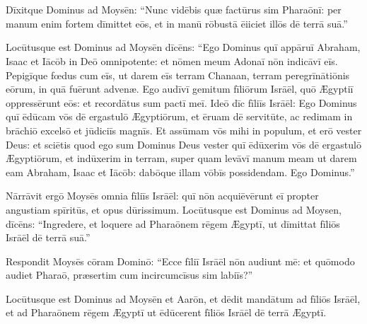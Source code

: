 \chapter{}
\thispagestyle{empty}

Dīxitque Dominus ad Moysēn: ``Nunc vidēbis quæ factūrus
sim Pharaōnī: per manum enim fortem dīmittet
eōs, et in manū rōbustā ēiiciet illōs
dē terrā suā.''

Locūtusque est Dominus ad Moysēn dīcēns: ``Ego Dominus
quī appāruī Abraham, Isaac et Iācōb
in Deō omnipotente: et nōmen meum Adonaī
 nōn indicāvī eīs. Pepigīque fœdus cum eīs, ut
darem eīs terram Chanaan, terram peregrīnātiōnis
eōrum, in quā fuērunt advenæ. 
Ego audīvī gemitum fīliōrum Isrāēl, quō
Ægyptiī oppressērunt eōs: et recordātus
sum pactī meī. Ideō dīc fīliīs Isrāēl: Ego Dominus
quī ēdūcam vōs dē ergastulō Ægyptiōrum, et
ēruam dē servitūte, ac redimam in brāchiō
excelsō et jūdiciīs magnīs. Et assūmam vōs mihi
in populum, et erō vester Deus: et sciētis quod ego
sum Dominus Deus vester quī ēdūxerim vōs dē
ergastulō Ægyptiōrum, et indūxerim in terram, super quam
levāvī manum meam ut darem eam Abraham, Isaac
et Iācōb: dabōque illam vōbīs possidendam. 
Ego Dominus.''

Nārrāvit ergō Moysēs omnia fīliīs Isrāēl: quī nōn
acquiēvērunt eī
propter angustiam spīritūs, et opus dūrissimum. Locūtusque est
Dominus ad Moysen, dīcēns: ``Ingredere, et loquere ad Pharaōnem rēgem
Ægyptī, ut dīmittat fīliōs Isrāēl dē terrā suā.''

Respondit Moysēs cōram Dominō: ``Ecce fīliī Isrāēl nōn audiunt mē: et
quōmodo audiet
 Pharaō, præsertim cum incircumcīsus sim labiīs?'' 

Locūtusque est
Dominus ad Moysēn et Aarōn, et dēdit mandātum ad fīliōs Isrāēl, et ad
Pharaōnem rēgem Ægyptī ut ēdūcerent fīliōs Isrāēl dē terrā Ægyptī.
